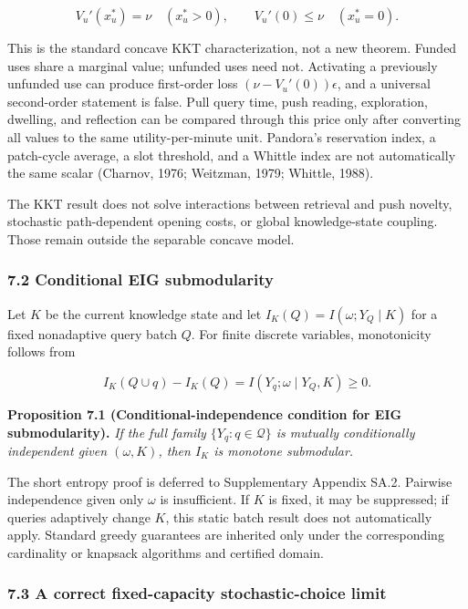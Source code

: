 \documentclass[
  11pt]{article}
\begin{document}
\[V_u'(x_u^*)=\nu\quad(x_u^*>0),\qquad V_u'(0)\le\nu\quad(x_u^*=0).\tag{10}\]

This is the standard concave KKT characterization, not a new theorem.
Funded uses share a marginal value; unfunded uses need not. Activating a
previously unfunded use can produce first-order loss
\((\nu-V_u'(0))\epsilon\), and a universal second-order statement is
false. Pull query time, push reading, exploration, dwelling, and
reflection can be compared through this price only after converting all
values to the same utility-per-minute unit. Pandora's reservation index,
a patch-cycle average, a slot threshold, and a Whittle index are not
automatically the same scalar (Charnov, 1976; Weitzman, 1979; Whittle,
1988).

The KKT result does not solve interactions between retrieval and push
novelty, stochastic path-dependent opening costs, or global
knowledge-state coupling. Those remain outside the separable concave
model.

\subsubsection{7.2 Conditional EIG
submodularity}\label{conditional-eig-submodularity}

Let \(K\) be the current knowledge state and let
\(I_K(Q)=I(\omega;Y_Q\mid K)\) for a fixed nonadaptive query batch
\(Q\). For finite discrete variables, monotonicity follows from

\[I_K(Q\cup q)-I_K(Q)=I(Y_q;\omega\mid Y_Q,K)\ge0.\]

\textbf{Proposition 7.1 (Conditional-independence condition for EIG
submodularity).} \emph{If the full family \(\{Y_q:q\in\mathcal Q\}\) is
mutually conditionally independent given \((\omega,K)\), then \(I_K\) is
monotone submodular.}

The short entropy proof is deferred to Supplementary Appendix SA.2.
Pairwise independence given only \(\omega\) is insufficient. If \(K\) is
fixed, it may be suppressed; if queries adaptively change \(K\), this
static batch result does not automatically apply. Standard greedy
guarantees are inherited only under the corresponding cardinality or
knapsack algorithms and certified domain.

\subsubsection{7.3 A correct fixed-capacity stochastic-choice
limit}\label{a-correct-fixed-capacity-stochastic-choice-limit}
\end{document}
